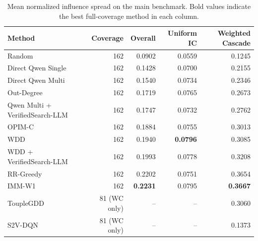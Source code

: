 \begin{table}[t]
\centering
\caption{Mean normalized influence spread on the main benchmark. Bold values indicate the best full-coverage method in each column.}
\label{tab:main_benchmark}
\small
\begin{tabular}{lrrrr}
\toprule
Method & Coverage & Overall & Uniform IC & Weighted Cascade \\
\midrule
Random & 162 & 0.0902 & 0.0559 & 0.1245 \\
Direct Qwen Single & 162 & 0.1428 & 0.0700 & 0.2155 \\
Direct Qwen Multi & 162 & 0.1540 & 0.0734 & 0.2346 \\
Out-Degree & 162 & 0.1719 & 0.0765 & 0.2673 \\
Qwen Multi + VerifiedSearch-LLM & 162 & 0.1747 & 0.0732 & 0.2762 \\
OPIM-C & 162 & 0.1884 & 0.0755 & 0.3013 \\
WDD & 162 & 0.1940 & \textbf{0.0796} & 0.3085 \\
WDD + VerifiedSearch-LLM & 162 & 0.1993 & 0.0778 & 0.3208 \\
RR-Greedy & 162 & 0.2202 & 0.0751 & 0.3654 \\
IMM-W1 & 162 & \textbf{0.2231} & 0.0795 & \textbf{0.3667} \\
ToupleGDD & 81 (WC only) & -- & -- & 0.3060 \\
S2V-DQN & 81 (WC only) & -- & -- & 0.1373 \\
\bottomrule
\end{tabular}
\end{table}
